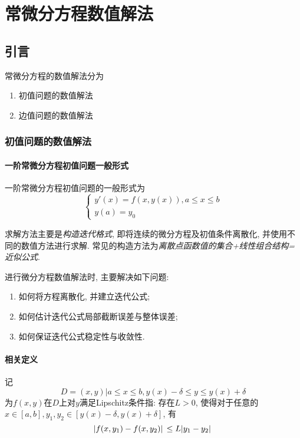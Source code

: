 \chapter{常微分方程数值解法}

\section{引言}

常微分方程的数值解法分为
\begin{enumerate}
    \item 初值问题的数值解法
    \item 边值问题的数值解法
\end{enumerate}

\subsection{初值问题的数值解法}

\subsubsection{一阶常微分方程初值问题一般形式}
一阶常微分方程初值问题的一般形式为
\begin{equation*}
    \begin{cases}
        y'(x)=f(x,y(x)), a\le x\le b\\
        y(a)=y_0
    \end{cases}
\end{equation*}

求解方法主要是\emph{构造迭代格式}, 即将连续的微分方程及初值条件离散化, 并使用不同的数值方法进行求解. 常见的构造方法为\emph{离散点函数值的集合+线性组合结构=近似公式}. 

进行微分方程数值解法时, 主要解决如下问题:
\begin{enumerate}
    \item 如何将方程离散化, 并建立迭代公式;
    \item 如何估计迭代公式局部截断误差与整体误差;
    \item 如何保证迭代公式稳定性与收敛性.
\end{enumerate}

\subsubsection{相关定义}

记
\begin{equation*}
    D={(x,y)|a\le x\le b, y(x)-\delta\le y\le y(x)+\delta}
\end{equation*}
为$f(x,y)$在$D$上对$y$满足Lipschitz条件指: 存在$L>0$, 使得对于任意的$x\in[a,b], y_1,y_2\in[y(x)-\delta,y(x)+\delta]$, 有
\begin{equation*}
    \abs*{f(x,y_1)-f(x,y_2)}\le L\abs*{y_1-y_2}
\end{equation*}


